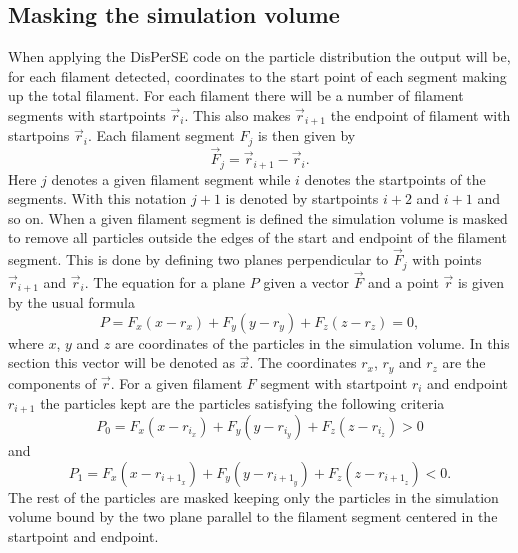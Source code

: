 \subsection{Masking the simulation volume}\label{sec:maskingfilament}
When applying the DisPerSE code on the particle distribution the output will be,
for each filament detected, coordinates to the start point of each segment
making up the total filament. For each filament there will be a number of
filament segments with startpoints $\vec{r}_i$. This also makes $\vec{r}_{i+1}$
the endpoint of filament with startpoins $\vec{r}_i$. Each filament segment $F_j$ is
then given by
\begin{equation}
    \vec{F}_{j}=\vec{r}_{i+1}-\vec{r}_i.
\end{equation}
Here $j$ denotes a given filament segment while $i$ denotes the startpoints of the
segments. With this notation $j+1$ is denoted by startpoints $i+2$ and $i+1$ and
so on. When a given filament segment is defined the simulation volume is masked
to remove all particles outside the edges of the start and endpoint of the
filament segment. This is done by defining  two planes perpendicular to
$\vec{F}_j$ with points $\vec{r}_{i+1}$ and $\vec{r}_i$. The equation for a
plane $P$ given a vector $\vec{F}$ and a point $\vec{r}$ is given
by the usual formula
\begin{equation}\label{eq:plane_mask}
    P=F_x(x-r_x)+F_y(y-r_y)+F_z(z-r_z)=0,
\end{equation}
where $x$, $y$ and $z$ are coordinates of the particles in the simulation
volume. In this section this vector will be denoted as $\vec{x}$.
The coordinates $r_x$, $r_y$ and $r_z$ are the components of $\vec{r}$.
For a given filament $F$ segment with startpoint $r_{i}$ and endpoint $r_{i+1}$ the particles kept are the particles
satisfying the following criteria
\begin{equation}
    P_0=F_x(x-r_{i_x})+F_y(y-r_{i_y})+F_z(z-r_{i_z})>0
\end{equation}
and
\begin{equation}
    P_1=F_x(x-r_{{i+1}_x})+F_y(y-r_{{i+1}_y})+F_z(z-r_{{i+1}_z})<0.
\end{equation}
The rest of the particles are masked keeping only the particles in the
simulation volume bound by the two plane parallel to the filament segment
centered in the startpoint and endpoint.

